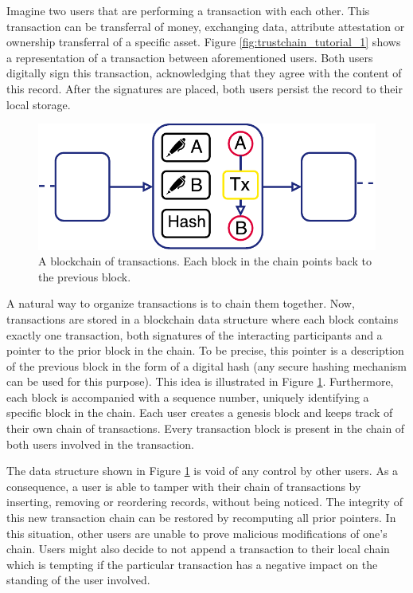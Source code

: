 \documentclass[USenglish]{article}
\begin{document}
Imagine two users that are performing a transaction with each other.
This transaction can be transferral of money, exchanging data, attribute attestation or ownership transferral of a specific asset.
Figure \ref{fig:trustchain_tutorial_1} shows a representation of a transaction between aforementioned users.
Both users digitally sign this transaction, acknowledging that they agree with the content of this record.
After the signatures are placed, both users persist the record to their local storage.

\begin{figure}[h!]
	\centering
	\includegraphics[width=0.7\columnwidth]{assets/trustchain_tutorial_2}
	\caption{A blockchain of transactions. Each block in the chain points back to the previous block.}
	\label{fig:trustchain_tutorial_2}
\end{figure}

A natural way to organize transactions is to chain them together.
Now, transactions are stored in a blockchain data structure where each block contains exactly one transaction, both signatures of the interacting participants and a pointer to the prior block in the chain.
To be precise, this pointer is a description of the previous block in the form of a digital hash (any secure hashing mechanism can be used for this purpose).
This idea is illustrated in Figure \ref{fig:trustchain_tutorial_2}.
Furthermore, each block is accompanied with a sequence number, uniquely identifying a specific block in the chain.
Each user creates a genesis block and keeps track of their own chain of transactions.
Every transaction block is present in the chain of both users involved in the transaction.

The data structure shown in Figure \ref{fig:trustchain_tutorial_2} is void of any control by other users. As a consequence, a user is able to tamper with their chain of transactions by inserting, removing or reordering records, without being noticed.
The integrity of this new transaction chain can be restored by recomputing all prior pointers.
In this situation, other users are unable to prove malicious modifications of one's chain.
Users might also decide to not append a transaction to their local chain which is tempting if the particular transaction has a negative impact on the standing of the user involved.
\end{document}
